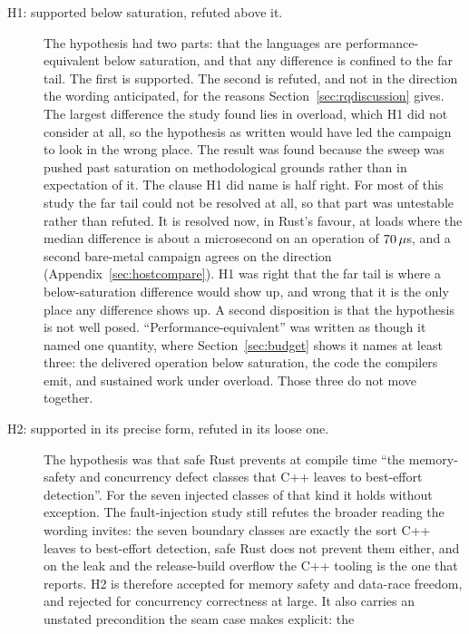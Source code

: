 \documentclass[english,oneside,a4paper,censored,csm,software-track-2020]{HYthesisML}
\begin{document}
\begin{description}
  \item[H1: supported below saturation, refuted above it.]
        The hypothesis had two parts: that the languages are performance-equivalent below
        saturation, and that any difference is confined to the far tail. The first is supported.
        The second is refuted, and not in the direction the wording anticipated, for the reasons
        Section~\ref{sec:rqdiscussion} gives. The largest difference the study found lies in
        overload, which H1 did not consider at all, so the hypothesis as written would have led
        the campaign to look in the wrong place. The result was found because the sweep was pushed
        past saturation on methodological grounds rather than in expectation of it. The clause H1
        did name is half right. For most of this study the far tail could not be resolved at all,
        so that part was untestable rather than refuted. It is resolved now, in Rust's favour, at
        loads where the median difference is about a microsecond on an operation of
        $70\,\mu$s, and a second bare-metal campaign agrees on the direction
        (Appendix~\ref{sec:hostcompare}). H1 was right that the far tail is where a
        below-saturation difference would show up, and wrong that it is the only place any
        difference shows up. A second disposition is that the hypothesis is not well posed.
        ``Performance-equivalent'' was written as though it named one quantity, where
        Section~\ref{sec:budget} shows it names at least three: the delivered operation below
        saturation, the code the compilers emit, and sustained work under overload. Those three do
        not move together.
  \item[H2: supported in its precise form, refuted in its loose one.] The hypothesis was
        that safe Rust prevents at compile time ``the memory-safety and concurrency defect
        classes that C++ leaves to best-effort detection''. For the seven injected classes of
        that kind it holds without exception. The fault-injection study still refutes the broader
        reading the wording invites: the seven boundary classes are exactly the sort C++ leaves to
        best-effort detection, safe Rust does not prevent them either, and on the leak and the
        release-build overflow the C++ tooling is the one that reports. H2 is therefore accepted
        for memory safety and data-race freedom, and rejected for concurrency correctness at
        large. It also carries an unstated precondition the seam case makes explicit: the

\end{description}
\end{document}

